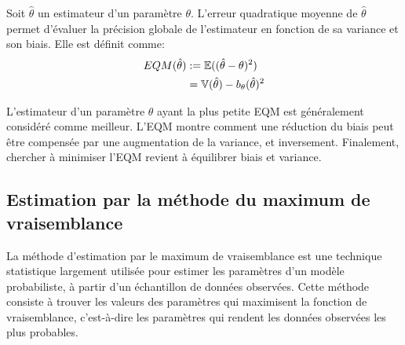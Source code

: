 \begin{definition}
    Soit $\hat{\theta}$ un estimateur d'un paramètre $\theta$. L'erreur quadratique moyenne de $\hat{\theta}$ 
    permet d'évaluer la précision globale de l'estimateur en fonction de sa variance et son biais. 
    Elle est définit comme: 
        \begin{align*}
            EQM(\hat{\theta}) &:= \mathbb{E}((\hat{\theta} - \theta)^2) \\ 
            &= \mathbb{V}(\hat{\theta}) - b_\theta(\hat{\theta})^2
        \end{align*}
\end{definition}

\begin{remark}[Interprétation]
    L'estimateur d'un paramètre $\theta$ ayant la plus petite EQM est généralement considéré comme meilleur.
    L'EQM montre comment une réduction du biais peut être compensée par une augmentation de la variance, et inversement.
    Finalement, chercher à minimiser l'EQM revient à équilibrer biais et variance.
\end{remark}

\begin{comment}
    \begin{example}[Application]
        Soit $(X_1, \dots, X_n)$ un échantillon aléatoire d'une distribution $X$ d'un caractère dans une population. 
        On suppose que $X$ ait une moyenne $\mu$ et une variance $\sigma^2$. Nous souhaitons estimer la variance du caractère 
        définit par $X$ dans la population à partir de l'échantillon prélevé. 
    
    \end{example}
\end{comment}

\subsection{Estimation par la méthode du maximum de vraisemblance}

La méthode d'estimation par le maximum de vraisemblance est une technique statistique largement 
utilisée pour estimer les paramètres d'un modèle probabiliste, à partir d'un échantillon de données observées. 
Cette méthode consiste à trouver les valeurs des paramètres qui maximisent la fonction de vraisemblance, 
c'est-à-dire les paramètres qui rendent les données observées les plus probables.

\newpage 

